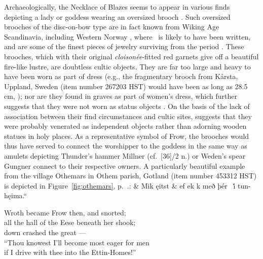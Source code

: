 {{Archaeologically, the Necklace of Blazes seems to appear in various finds depicting a lady or goddess wearing an oversized brooch \parencite[79--84]{Arrhenius1962}.  Such oversized brooches of the disc-on-bow type are in fact known from Wiking Age Scandinavia, including Western Norway \parencite[86]{Arrhenius1962}, where \Thrymskvida\ is likely to have been written, and are some of the finest pieces of jewelry surviving from the period \parencite[87]{Arrhenius1962}.
These brooches, which with their original \emph{cloisonée}-fitted red garnets give off a beautiful fire-like lustre, are doubtless cultic objects.  They are far too large and heavy to have been worn as part of dress (e.g., the fragmentary brooch from Kårsta, Uppland, Sweden (item number 267203 HST) would have been as long as 28.5 cm, \cite[93]{Arrhenius1962}); nor are they found in graves as part of women’s dress, which further suggests that they were not worn as status objects \parencite[84--85, 97]{Arrhenius1962}.  On the basis of the lack of association between their find circumstances and cultic sites, \textcite[97]{Arrhenius1962} suggests that they were probably venerated as independent objects rather than adorning wooden statues in holy places.  As a representative symbol of Frow, the brooches would thus have served to connect the worshipper to the goddess in the same way as amulets depicting Thunder’s hammer Millner (cf.~[36]/2 n.) or Weden’s spear Gungner connect to their respective owners.
A particularly beautiful example from the village Othemars in Othem parish, Gotland (item number 453312 HST) is depicted in Figure~\ref{fig:othemars}, p.~\pageref{fig:othemars}.}}: &
Mik ęitst  &
ef ek k með þér \hld\ i̇́ tun-hęima.“\eva

\bvb Wroth became Frow then, and snorted; \\
all the hall of the Eese beneath her shook; \\
down crashed the great --- \\
“Thou knowest I’ll become most eager for men \\
if I drive with thee into the Ettin-Homes!”\evb\evg


